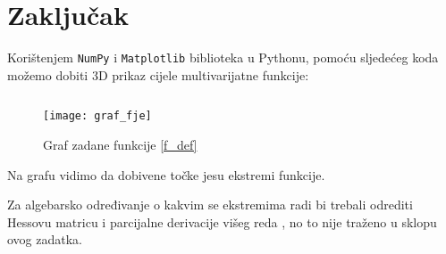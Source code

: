 \chapter{Zaključak}

Korištenjem \verb|NumPy| i \verb|Matplotlib| biblioteka u Pythonu, pomoću sljedećeg koda možemo dobiti 3D prikaz cijele multivarijatne funkcije:

\inputminted{python}{./code/graf_fje.py}

\begin{figure}
    \centering
    \texttt{[image: graf\_fje]}
    \caption{Graf zadane funkcije \eqref{f_def}}
\end{figure}

Na grafu vidimo da dobivene točke jesu ekstremi funkcije. \par
Za algebarsko određivanje o kakvim se ekstremima radi bi trebali odrediti Hessovu matricu i parcijalne derivacije višeg reda \cite[][poglavlje 6.3]{ccalc}, no to nije traženo u sklopu ovog zadatka.

\newpage
